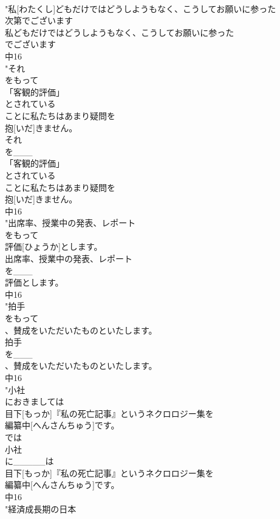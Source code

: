 \documentclass[8pt]{extreport}
\begin{document}
\begin{CJK}{UTF8}{min}
\\	"私[わたくし]どもだけではどうしようもなく、こうしてお願いに参った
\\	次第でございます
\\	私どもだけではどうしようもなく、こうしてお願いに参った
\\	でございます
\\	中16
\\	"それ
\\	をもって
\\	「客観的評価」
\\	とされている
\\	ことに私たちはあまり疑問を
\\	抱[いだ]きません。
\\	それ
\\	を___
\\	「客観的評価」
\\	とされている
\\	ことに私たちはあまり疑問を
\\	抱[いだ]きません。
\\	中16
\\	"出席率、授業中の発表、レポート
\\	をもって
\\	評価[ひょうか]とします。
\\	出席率、授業中の発表、レポート
\\	を___
\\	評価とします。
\\	中16
\\	"拍手
\\	をもって
\\	、賛成をいただいたものといたします。
\\	拍手
\\	を___
\\	、賛成をいただいたものといたします。
\\	中16
\\	"小社
\\	におきましては
\\	目下[もっか]『私の死亡記事』というネクロロジー集を
\\	編纂中[へんさんちゅう]です。
\\	では 
\\	小社
\\	に_____は
\\	目下[もっか]『私の死亡記事』というネクロロジー集を
\\	編纂中[へんさんちゅう]です。
\\	中16
\\	"経済成長期の日本

\end{CJK}
\end{document}

